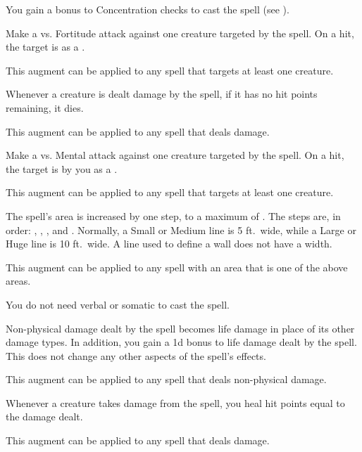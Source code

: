         {
             You gain a  bonus to Concentration checks to cast the spell (see ).

             Make a  vs. Fortitude attack against one creature targeted by the spell.
            On a hit, the target is  as a .
            \par This augment can be applied to any spell that targets at least one creature.

             Whenever a creature is dealt damage by the spell, if it has no hit points remaining, it dies.
            \par This augment can be applied to any spell that deals damage.

             Make a  vs. Mental attack against one creature targeted by the spell.
            On a hit, the target is  by you as a .
            \par This augment can be applied to any spell that targets at least one creature.

             The spell's area is increased by one step, to a maximum of \areahuge.
            The steps are, in order: \areasmall, \areamed, \arealarge, and \areahuge.
            Normally, a Small or Medium line is 5 ft.\ wide, while a Large or Huge line is 10 ft.\ wide.
            A line used to define a wall does not have a width.
            \par This augment can be applied to any spell with an area that is one of the above areas.

             You do not need verbal or somatic  to cast the spell.

             Non-physical damage dealt by the spell becomes life damage in place of its other damage types.
            In addition, you gain a \plus1d bonus to life damage dealt by the spell.
            This does not change any other aspects of the spell's effects.
            \par This augment can be applied to any spell that deals non-physical damage.

             Whenever a creature takes damage from the spell, you heal hit points equal to the damage dealt.
            \par This augment can be applied to any spell that deals damage.

}
